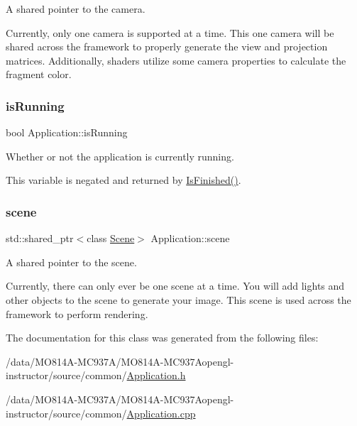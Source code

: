 A shared pointer to the camera.

Currently, only one camera is supported at a time. This one camera will be shared across the framework to properly generate the view and projection matrices. Additionally, shaders utilize some camera properties to calculate the fragment color. \hypertarget{class_application_ae1c1ff7a7663d9baa9b65a7ba8e1dcf8}{}\label{class_application_ae1c1ff7a7663d9baa9b65a7ba8e1dcf8}
\subsubsection{\texorpdfstring{is\+Running}{isRunning}}
{\footnotesize\ttfamily bool Application\+::is\+Running\hspace{0.3cm}{\ttfamily [protected]}}



Whether or not the application is currently running.

This variable is negated and returned by \hyperlink{class_application_a454a1d926759c4bfac47e730570a7743}{Is\+Finished()}. \hypertarget{class_application_a88c6615107a5094bb93fa5f153f79554}{}\label{class_application_a88c6615107a5094bb93fa5f153f79554}
\subsubsection{\texorpdfstring{scene}{scene}}
{\footnotesize\ttfamily std\+::shared\+\_\+ptr$<$class \hyperlink{class_scene}{Scene}$>$ Application\+::scene\hspace{0.3cm}{\ttfamily [protected]}}



A shared pointer to the scene.

Currently, there can only ever be one scene at a time. You will add lights and other objects to the scene to generate your image. This scene is used across the framework to perform rendering.

The documentation for this class was generated from the following files\+:\begin{DoxyCompactItemize}
\item
/data/MO814A-MC937A/MO814A-MC937Aopengl-\/instructor/source/common/\hyperlink{_application_8h}{Application.\+h}\item
/data/MO814A-MC937A/MO814A-MC937Aopengl-\/instructor/source/common/\hyperlink{_application_8cpp}{Application.\+cpp}\end{DoxyCompactItemize}
